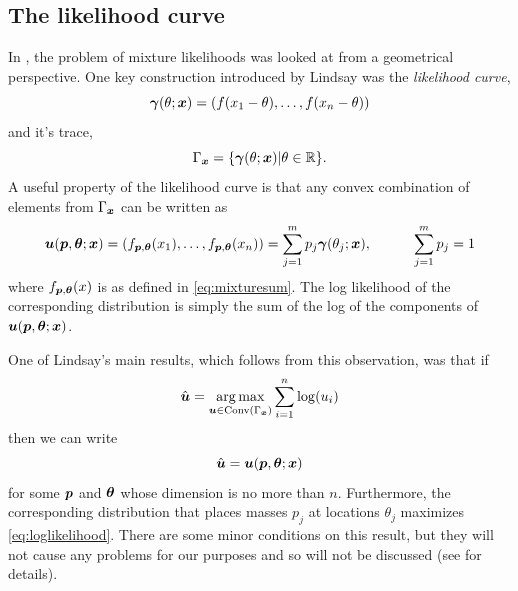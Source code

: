 	\subsection{The likelihood curve}
		In \cite{Lindsay1983-tf}, the problem of mixture likelihoods was looked at from a geometrical perspective. One key construction introduced by Lindsay was the \emph{likelihood curve},
		\begin{equation}
			{\bm{{\gamma}}}(\theta;{\bm{{x}}}) = (f(x_{1}-\theta),\dots,f(x_{n}-\theta))
			\label{eq:Gamma}
		\end{equation}
		and it's trace,
		\begin{equation}
			\Gamma_{{\bm{{x}}}} = \{{\bm{{\gamma}}}(\theta;{\bm{{x}}})| \theta \in \mathbb{R}\}.
		\end{equation}
		A useful property of the likelihood curve is that any convex combination of elements from $\Gamma_{{\bm{{x}}}}$ can be written as
		\begin{equation}
			{\bm{{u}}}({\bm{{p}}},{\bm{{\theta}}};{\bm{{x}}}) = (f_{{\bm{{p}}},{\bm{{\theta}}}}(x_{1}),\dots,f_{{\bm{{p}}},{\bm{{\theta}}}}(x_{n})) = \sum_{j = 1}^m p_j {\bm{{\gamma}}}(\theta_j;{\bm{{x}}}), \hspace{30pt} \sum_{j=1}^m p_j = 1
			\label{eq:convexcombinationgamma}
		\end{equation}
		where $f_{{\bm{{p}}},{\bm{{\theta}}}}(x)$ is as defined in \eqref{eq:mixturesum}. The log likelihood of the corresponding distribution is simply the sum of the log of the components of ${\bm{{u}}}({\bm{{p}}},{\bm{{\theta}}};{\bm{{x}}})$.
		
		One of Lindsay's main results, which follows from this observation, was that if
		\begin{equation}
			\hat{{\bm{{u}}}} = \operatorname*{arg\,max}_{{\bm{{u}}} \in \mathrm{Conv}(\Gamma_{{\bm{{x}}}})} \sum_{i=1}^n \log(u_i)
			\label{eq:optimalu}
		\end{equation}
		then we can write
		\begin{equation}
			\hat{{\bm{{u}}}} = {\bm{{u}}}({\bm{{p}}},{\bm{{\theta}}};{\bm{{x}}})
		\end{equation}
		for some ${\bm{{p}}}$ and ${\bm{{\theta}}}$ whose dimension is no more than $n$. Furthermore, the corresponding distribution that places masses $p_j$ at locations $\theta_j$ maximizes \eqref{eq:loglikelihood}. There are some minor conditions on this result, but they will not cause any problems for our purposes and so will not be discussed (see \cite{Lindsay1983-tf} for details).
